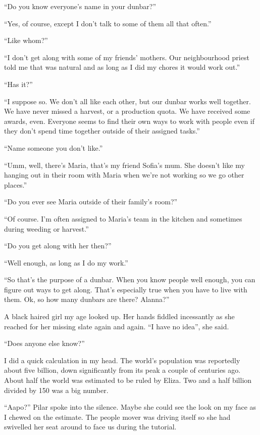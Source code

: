 ``Do you know everyone's name in your dunbar?''

``Yes, of course, except I don't talk to some of them all that often.''

``Like whom?''

``I don't get along with some of my friends' mothers. Our neighbourhood priest told me that was natural and as long as I did my chores it would work out.''

``Has it?''

``I suppose so. We don't all like each other, but our dunbar works well together. We have never missed a harvest, or a production quota. We have received some awards, even. Everyone seems to find their own ways to work with people even if they don't spend time together outside of their assigned tasks.''

``Name someone you don't like.''

``Umm, well, there's Maria, that's my friend Sofia's mum. She doesn't like my hanging out in their room with Maria when we're not working so we go other places.''

``Do you ever see Maria outside of their family's room?''

``Of course. I'm often assigned to Maria's team in the kitchen and sometimes during weeding or harvest.''

``Do you get along with her then?''

``Well enough, as long as I do my work.''

``So that's the purpose of a dunbar. When you know people well enough, you can figure out ways to get along. That's especially true when you have to live with them.  Ok, so how many dunbars are there? Alanna?''

A black haired girl my age looked up. Her hands fiddled incessantly as she reached for her missing slate again and again. ``I have no idea'', she said.

``Does anyone else know?''

I did a quick calculation in my head. The world's population was reportedly about five billion, down significantly from its peak a couple of centuries ago. About half the world was estimated to be ruled by Eliza. Two and a half billion divided by 150 was a big number.

``Aapo?'' Pilar spoke into the silence. Maybe she could see the look on my face as I chewed on the estimate. The people mover was driving itself so she had swivelled her seat around to face us during the tutorial.

